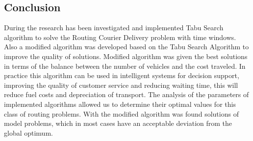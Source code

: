 \documentclass[]{TAACpaper}
\begin{document}
 
\subsection{Conclusion}
During the research has been investigated and implemented Tabu Search algorithm to solve the Routing Courier Delivery problem with time windows. Also a modified algorithm was developed  based on the Tabu Search Algorithm to improve the quality of solutions. Modified algorithm was given the best solutions in terms of the balance between the number of vehicles and the cost traveled.  In practice this algorithm can be used in intelligent systems for decision support, improving the quality of customer service and reducing waiting time, this will reduce fuel costs and depreciation of transport.
The analysis of the parameters of implemented algorithms allowed us to determine their optimal values for this class of routing problems. With the modified algorithm was found solutions of model problems, which in most cases have an acceptable deviation from the global optimum.
\end{document}
